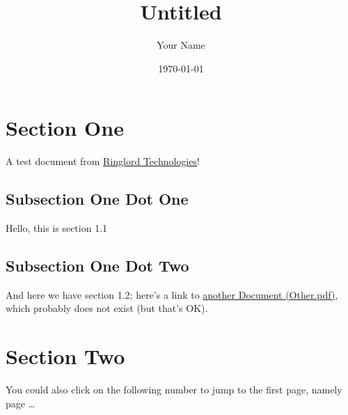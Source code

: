 \documentclass{article}
\title{Untitled}
\author{Your Name}
\date{\today}
\begin{document}
\label{start}

\maketitle

\section{Section One}

A test document from
\href{http://www.Ringlord.com/}{Ringlord Technologies}!

\subsection{Subsection One Dot One}

Hello, this is section 1.1

\subsection{Subsection One Dot Two}

And here we have section 1.2; here's a link to
\href{Other.pdf}{another Document (Other.pdf)},
which probably does not exist (but that's OK).

\section{Section Two}

You could also click on the following number to jump to
the first page, namely page \pageref{start}\ldots

\label{end}
\end{document}
